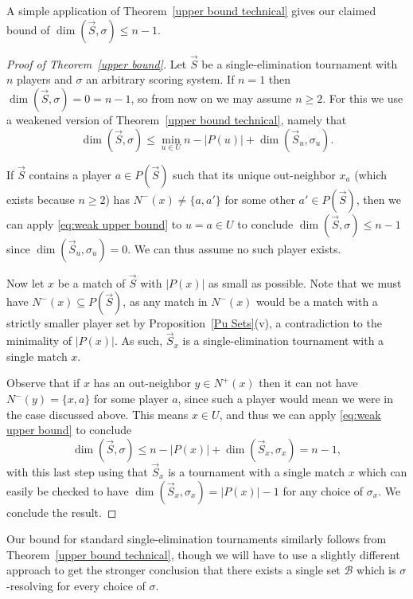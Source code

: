 \documentclass[12pt,letterpaper]{article}
\theoremstyle{definition}
\newcommand{\sig}{\sigma}
\renewcommand{\1}{\mathbbm{1}}
\newcommand{\sub}{\subseteq}
\renewcommand{\c}[1]{\mathcal{#1}}
\newcommand{\tour}{\vec{S}}
\begin{document}
A simple application of Theorem~\ref{upper bound technical} gives our claimed bound of $\dim(\tour,\sig)\le n-1$.
\begin{proof}[Proof of Theorem~\ref{upper bound}]
	Let $\tour$ be a single-elimination tournament with $n$ players and $\sig$ an arbitrary scoring system.  If $n=1$ then $\dim(\tour,\sig)=0=n-1$, so from now on we may assume $n\ge 2$.   For this we use a weakened version of Theorem~\ref{upper bound technical}, namely that
	\begin{equation}\dim(\tour,\sig)\le \min_{u\in U} n-|P(u)|+\dim(\tour_u,\sig_u).\label{eq:weak upper bound}\end{equation}
	 
	
	If $\tour$ contains a player $a\in P(\tour)$ such that its unique out-neighbor $x_a$ (which exists because $n\ge 2$) has $N^-(x)\ne \{a,a'\}$ for some other $a'\in P(\tour)$, then we can apply \eqref{eq:weak upper bound} to $u=a\in U$ to conclude $\dim(\tour,\sig)\le n-1$ since $\dim(\tour_u,\sig_u)=0$.  We can thus assume no such player exists.
	
	Now let $x$ be a match of $\tour$ with $|P(x)|$ as small as possible.  Note that we must have $N^-(x)\sub P(\tour)$, as any match in $N^-(x)$ would be a match with a strictly smaller player set by Proposition~\ref{Pu Sets}(v), a contradiction to the minimality of $|P(x)|$.  As such, $\tour_x$ is a single-elimination tournament with a single match $x$.  
	
	Observe that if $x$ has an out-neighbor $y\in N^+(x)$ then it can not have $N^-(y)=\{x,a\}$ for some player $a$, since such a player would mean we were in the case discussed above.  This means $x\in U$, and thus we can apply \eqref{eq:weak upper bound} to conclude
	\[\dim(\tour,\sig)\le n-|P(x)|+\dim(\tour_x,\sig_x)=n-1,\]
	with this last step using that $\tour_x$ is a tournament with a single match $x$ which can easily be checked to have $\dim(\tour_x,\sig_x)=|P(x)|-1$ for any choice of $\sig_x$.  We conclude the result.
\end{proof}
Our bound for standard single-elimination tournaments similarly follows from Theorem~\ref{upper bound technical}, though we will have to use a slightly different approach to get the stronger conclusion that there exists a single set $\c{B}$ which is $\sig$-resolving for every choice of $\sig$.
\end{document}
